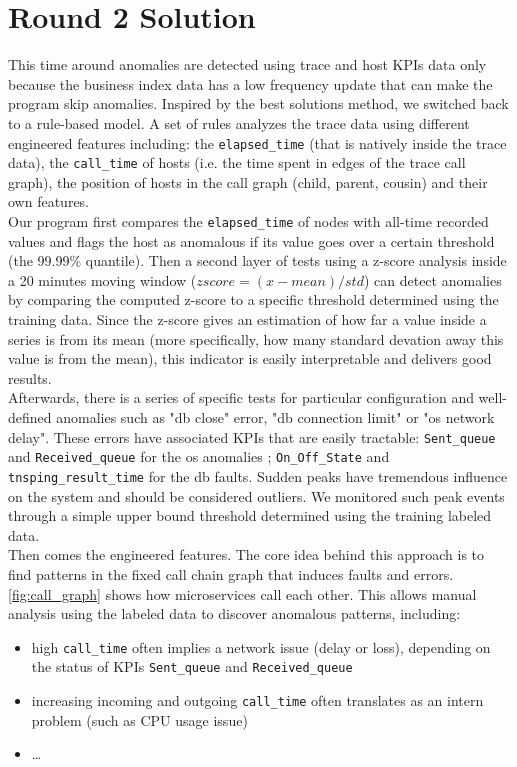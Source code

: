 \documentclass[acmsmall, screen, nonacm]{acmart}
\begin{document}
\section{Round 2 Solution}
This time around anomalies are detected using trace and host KPIs data only because the business index data has a low frequency update that can make the program skip anomalies. 
Inspired by the best solutions method, we switched back to a rule-based model.
A set of rules analyzes the trace data using different engineered features including: the \verb|elapsed_time| (that is natively inside the trace data), the \verb|call_time| of hosts (i.e. the time spent in edges of the trace call graph), the position of hosts in the call graph (child, parent, cousin) and their own features. 
\\
Our program first compares the \verb|elapsed_time| of nodes with all-time recorded values and flags the host as anomalous if its value goes over a certain threshold (the 99.99\% quantile).
Then a second layer of tests using a z-score analysis inside a 20 minutes moving window ($zscore = (x-mean) / std$) can detect anomalies by comparing the computed z-score to a specific threshold determined using the training data.
Since the z-score gives an estimation of how far a value inside a series is from its mean (more specifically, how many standard devation away this value is from the mean), this indicator is easily interpretable and delivers good results. 
\\
Afterwards, there is a series of specific tests for particular configuration and well-defined anomalies such as "db close" error, "db connection limit" or "os network delay".
These errors have associated KPIs that are easily tractable: \verb|Sent_queue| and \verb|Received_queue| for the os anomalies ; \verb|On_Off_State| and \verb|tnsping_result_time| for the db faults. 
Sudden peaks have tremendous influence on the system and should be considered outliers. 
We monitored such peak events through a simple upper bound threshold determined using the training labeled data.  
\\
Then comes the engineered features. 
The core idea behind this approach is to find patterns in the fixed call chain graph that induces faults and errors. 
\autoref{fig:call_graph} shows how microservices call each other. 
This allows manual analysis using the labeled data to discover anomalous patterns, including:
\begin{itemize}
  \item high \verb|call_time| often implies a network issue (delay or loss), depending on the status of KPIs \verb|Sent_queue| and \verb|Received_queue|
  \item increasing incoming and outgoing \verb|call_time| often translates as an intern problem (such as CPU usage issue)
  \item \dots
\end{itemize}
\end{document}
